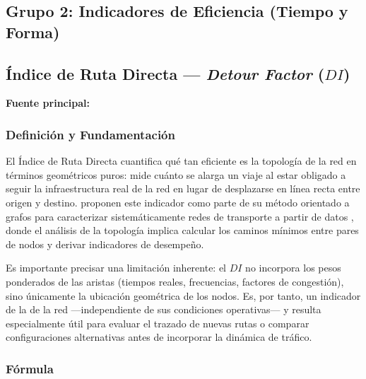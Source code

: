 \subsection*{Grupo 2: Indicadores de Eficiencia (Tiempo y Forma)}

\subsection{Índice de Ruta Directa --- \texorpdfstring{\textit{Detour Factor} ($DI$)}{Detour Factor (DI)}}
\label{subsec:ruta-directa}

\textbf{Fuente principal:} \textcite{fortin2016innovative}

\subsubsection{Definición y Fundamentación}

El Índice de Ruta Directa cuantifica qué tan eficiente es la topología de la red en
términos geométricos puros: mide cuánto se alarga un viaje al estar obligado a
seguir la infraestructura real de la red en lugar de desplazarse en línea recta entre
origen y destino. \textcite{fortin2016innovative} proponen este indicador como parte de su
método orientado a grafos para caracterizar sistemáticamente redes de transporte a
partir de datos \gtfs{}, donde el análisis de la topología implica calcular los caminos
mínimos entre pares de nodos y derivar indicadores de desempeño.

Es importante precisar una limitación inherente: el $DI$ no incorpora los pesos
ponderados de las aristas (tiempos reales, frecuencias, factores de congestión),
sino únicamente la ubicación geométrica de los nodos. Es, por tanto, un indicador
de la  de la red ---independiente de sus condiciones
operativas--- y resulta especialmente útil para evaluar el trazado de nuevas rutas o
comparar configuraciones alternativas antes de incorporar la dinámica de tráfico.

\subsubsection{Fórmula}

